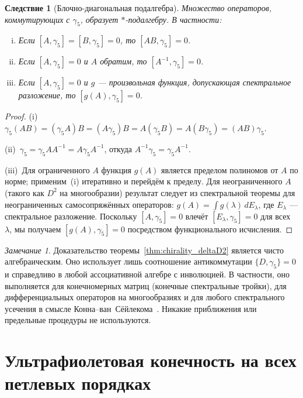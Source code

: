 \documentclass[12pt,a4paper]{article}
\newtheorem{corollary}[theorem]{Следствие}
\theoremstyle{definition}
\theoremstyle{remark}
\newtheorem{remark}[theorem]{Замечание}
\begin{document}
\begin{corollary}[Блочно-диагональная подалгебра]\label{cor:subalgebra}
Множество операторов, коммутирующих с $\gamma_5$, образует
$*$-подалгебру.  В частности:
\begin{enumerate}[(i)]
  \item Если $[A, \gamma_5] = [B, \gamma_5] = 0$, то
        $[AB, \gamma_5] = 0$.
  \item Если $[A, \gamma_5] = 0$ и $A$ обратим, то
        $[A^{-1}, \gamma_5] = 0$.
  \item Если $[A, \gamma_5] = 0$ и $g$ --- произвольная функция,
        допускающая спектральное разложение, то $[g(A), \gamma_5] = 0$.
\end{enumerate}
\end{corollary}

\begin{proof}
(i)~$\gamma_5(AB) = (\gamma_5 A)B = (A\gamma_5)B = A(\gamma_5 B) = A(B\gamma_5) = (AB)\gamma_5$.

(ii)~$\gamma_5 = \gamma_5 AA^{-1} = A\gamma_5 A^{-1}$, откуда
$A^{-1}\gamma_5 = \gamma_5 A^{-1}$.

(iii)~Для ограниченного $A$ функция $g(A)$ является пределом
полиномов от $A$ по норме; применим~(i) итеративно и перейдём к
пределу.  Для неограниченного $A$ (такого как $D^2$ на многообразии)
результат следует из спектральной теоремы для неограниченных
самосопряжённых операторов: $g(A) = \int g(\lambda)\,dE_\lambda$, где
$E_\lambda$ --- спектральное разложение.  Поскольку
$[A, \gamma_5] = 0$ влечёт $[E_\lambda, \gamma_5] = 0$ для
всех~$\lambda$, мы получаем $[g(A), \gamma_5] = 0$ посредством
функционального исчисления.
\end{proof}

\begin{remark}
Доказательство теоремы~\ref{thm:chirality_deltaD2} является чисто
алгебраическим.  Оно использует лишь соотношение антикоммутации
$\{D, \gamma_5\} = 0$ и справедливо в любой ассоциативной алгебре с
инволюцией.  В частности, оно выполняется для конечномерных матриц
(конечные спектральные тройки), для дифференциальных операторов на
многообразиях и для любого спектрального усечения в смысле
Конна--ван~Сёйлекома~\cite{Connes:2020trunc}.  Никакие приближения или
предельные процедуры не используются.
\end{remark}

\section{Ультрафиолетовая конечность на всех петлевых порядках}
\label{sec:uv_finiteness}
\end{document}
